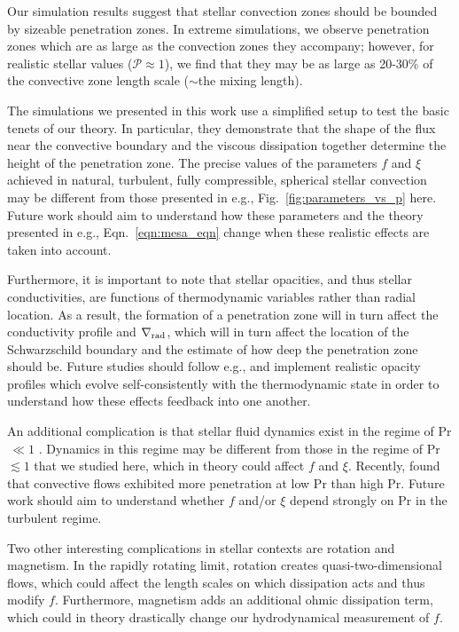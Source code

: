 \documentclass[twocolumn]{aastex631}
\newcommand{\gradrad}{\ensuremath{\nabla_{\rm{rad}}}}
\newcommand{\mP}{\ensuremath{\mathcal{P}}}
\newcommand\Pran{\ensuremath{\mathrm{Pr}}}
\begin{document}
Our simulation results suggest that stellar convection zones should be bounded by sizeable penetration zones.
In extreme simulations, we observe penetration zones which are as large as the convection zones they accompany; however, for realistic stellar values ($\mP \approx 1$), we find that they may be as large as 20-30\% of the convective zone length scale ($\sim$the mixing length).

The simulations we presented in this work use a simplified setup to test the basic tenets of our theory.
In particular, they demonstrate that the shape of the flux near the convective boundary and the viscous dissipation together determine the height of the penetration zone.
The precise values of the parameters $f$ and $\xi$ achieved in natural, turbulent, fully compressible, spherical stellar convection may be different from those presented in e.g., Fig.~\ref{fig:parameters_vs_p} here.
Future work should aim to understand how these parameters and the theory presented in e.g., Eqn.~\ref{eqn:mesa_eqn} change when these realistic effects are taken into account.

Furthermore, it is important to note that stellar opacities, and thus stellar conductivities, are functions of thermodynamic variables rather than radial location.
As a result, the formation of a penetration zone will in turn affect the conductivity profile and $\gradrad$, which will in turn affect the location of the Schwarzschild boundary and the estimate of how deep the penetration zone should be.
Future studies should follow e.g., \citet{kapyla_etal_2017} and implement realistic opacity profiles which evolve self-consistently with the thermodynamic state in order to understand how these effects feedback into one another.

An additional complication is that stellar fluid dynamics exist in the regime of Pr$\,\ll1$ \citep{garaud2021}.
Dynamics in this regime may be different from those in the regime of Pr $\lesssim 1$ that we studied here, which in theory could affect $f$ and $\xi$.
Recently, \citet{kapyla2021} found that convective flows exhibited more penetration at low Pr than high Pr.
Future work should aim to understand whether $f$ and/or $\xi$ depend strongly on $\Pran$ in the turbulent regime.

Two other interesting complications in stellar contexts are rotation and magnetism.
In the rapidly rotating limit, rotation creates quasi-two-dimensional flows, which could affect the length scales on which dissipation acts and thus modify $f$.
Furthermore, magnetism adds an additional ohmic dissipation term, which could in theory drastically change our hydrodynamical measurement of $f$.
\end{document}
